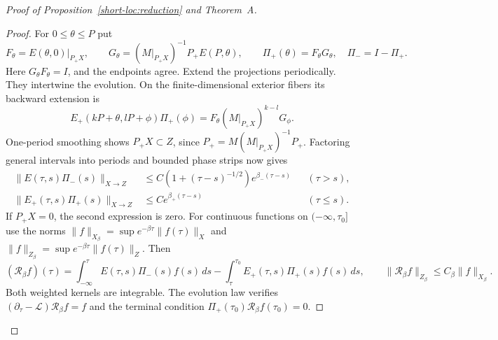 \begin{proof}[Proof of Proposition~\ref{short-loc:reduction} and Theorem~A]
\begin{proof}
For $0\le\theta\le P$ put
\[
 F_\theta=E(\theta,0)|_{P_+X},\qquad
 G_\theta=(M|_{P_+X})^{-1}P_+E(P,\theta),\qquad
 \Pi_+(\theta)=F_\theta G_\theta,\quad\Pi_-=I-\Pi_+.
\]
Here $G_\theta F_\theta=I$, and the endpoints agree. Extend the
projections periodically. They intertwine the evolution. On the
finite-dimensional exterior fibers its backward extension is
\[
 E_+(kP+\theta,lP+\phi)\Pi_+(\phi)
       =F_\theta(M|_{P_+X})^{k-l}G_\phi.
\]
One-period smoothing shows $P_+X\subset Z$, since
$P_+=M(M|_{P_+X})^{-1}P_+$. Factoring general intervals into
periods and bounded phase strips now gives
\[
 \begin{aligned}
 \|E(\tau,s)\Pi_-(s)\|_{X\to Z}
   &\le C(1+(\tau-s)^{-1/2})e^{\beta_-(\tau-s)}&& (\tau>s),\\
 \|E_+(\tau,s)\Pi_+(s)\|_{X\to Z}
   &\le Ce^{\beta_+(\tau-s)}&& (\tau\le s).
 \end{aligned}
\]
If $P_+X=0$, the second expression is zero. For continuous functions
on $(-\infty,\tau_0]$ use the norms
$\|f\|_{X_\beta}=\sup e^{-\beta\tau}\|f(\tau)\|_X$ and
$\|f\|_{Z_\beta}=\sup e^{-\beta\tau}\|f(\tau)\|_Z$. Then
\begin{equation}\label{short-loc:right-inverse}
 (\mathcal R_\beta f)(\tau)
 =\int_{-\infty}^{\tau}E(\tau,s)\Pi_-(s)f(s)\,ds
  -\int_\tau^{\tau_0}E_+(\tau,s)\Pi_+(s)f(s)\,ds,
 \qquad
 \|\mathcal R_\beta f\|_{Z_\beta}\le C_\beta\|f\|_{X_\beta}.
\end{equation}
Both weighted kernels are integrable. The evolution law verifies
$(\partial_\tau-\mathcal L)\mathcal R_\beta f=f$ and the terminal
condition $\Pi_+(\tau_0)\mathcal R_\beta f(\tau_0)=0$.


\end{proof}
\end{proof}
